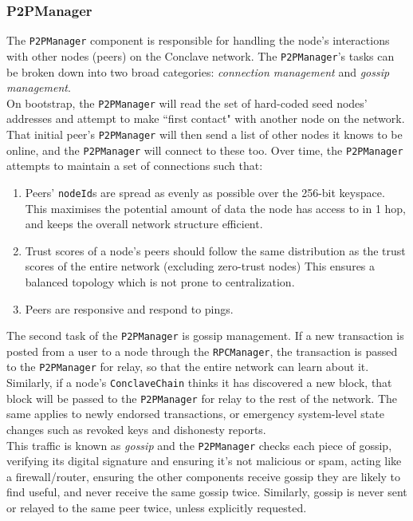 \documentclass{report}
\begin{document}
			\subsubsection{P2PManager}
			The \texttt{P2PManager} component is responsible for handling the node's interactions with other nodes (peers) on the Conclave network. The \texttt{P2PManager}'s tasks can be broken down into two broad categories: \textit{connection management} and \textit{gossip management}. \\
			
			On bootstrap, the \texttt{P2PManager} will read the set of hard-coded seed nodes' addresses and attempt to make ``first contact" with another node on the network. That initial peer's \texttt{P2PManager} will then send a list of other nodes it knows to be online, and the \texttt{P2PManager} will connect to these too. Over time, the \texttt{P2PManager} attempts to maintain a set of connections such that:
			\begin{enumerate}
			  \item Peers' \texttt{nodeId}s are spread as evenly as possible over the 256-bit keyspace. This maximises the potential amount of data the node has access to in 1 hop, and keeps the overall network structure efficient.
			  \item Trust scores of a node's peers should follow the same distribution as the trust scores of the entire network (excluding zero-trust nodes) This ensures a balanced topology which is not prone to centralization.
			  \item Peers are responsive and respond to pings.
			\end{enumerate}
			The second task of the \texttt{P2PManager} is gossip management.   If a new transaction is posted from a user to a node through the \texttt{RPCManager},  the transaction is passed to the \texttt{P2PManager} for relay, so that the entire network can learn about it. Similarly, if a node's \texttt{ConclaveChain} thinks it has discovered a new block, that block will be passed to the \texttt{P2PManager} for relay to the rest of the network. The same applies to newly endorsed transactions, or emergency system-level state changes such as revoked keys and dishonesty reports. \\
			
			This traffic is known as \textit{gossip} and the \texttt{P2PManager} checks each piece of gossip, verifying its digital signature and ensuring it's not malicious or spam, acting like a firewall/router, ensuring the other components receive gossip they are likely to find useful, and never receive the same gossip twice. Similarly, gossip is never sent or relayed to the same peer twice, unless explicitly requested.
			
\end{document}

